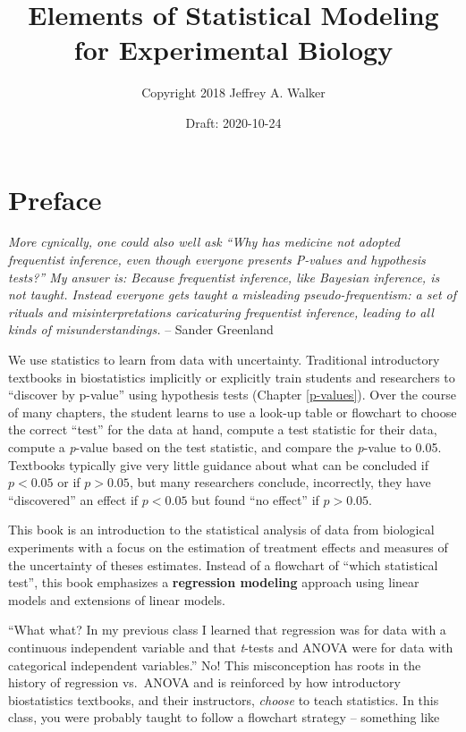 \documentclass[]{book}
\title{Elements of Statistical Modeling for Experimental Biology}
\author{Copyright 2018 Jeffrey A. Walker}
\date{Draft: 2020-10-24}
\begin{document}
\maketitle

{
\setcounter{tocdepth}{1}
\tableofcontents
}
\hypertarget{preface}{%
\chapter*{Preface}\label{preface}}

\emph{More cynically, one could also well ask ``Why has medicine not adopted frequentist inference, even though everyone presents P-values and hypothesis tests?'' My answer is: Because frequentist inference, like Bayesian inference, is not taught. Instead everyone gets taught a misleading pseudo-frequentism: a set of rituals and misinterpretations caricaturing frequentist inference, leading to all kinds of misunderstandings.} -- Sander Greenland

We use statistics to learn from data with uncertainty. Traditional introductory textbooks in biostatistics implicitly or explicitly train students and researchers to ``discover by p-value'' using hypothesis tests (Chapter \ref{p-values}). Over the course of many chapters, the student learns to use a look-up table or flowchart to choose the correct ``test'' for the data at hand, compute a test statistic for their data, compute a \emph{p}-value based on the test statistic, and compare the \emph{p}-value to 0.05. Textbooks typically give very little guidance about what can be concluded if \(p < 0.05\) or if \(p > 0.05\), but many researchers conclude, incorrectly, they have ``discovered'' an effect if \(p < 0.05\) but found ``no effect'' if \(p > 0.05\).

This book is an introduction to the statistical analysis of data from biological experiments with a focus on the estimation of treatment effects and measures of the uncertainty of theses estimates. Instead of a flowchart of ``which statistical test'', this book emphasizes a \textbf{regression modeling} approach using linear models and extensions of linear models.

``What what? In my previous class I learned that regression was for data with a continuous independent variable and that \emph{t}-tests and ANOVA were for data with categorical independent variables.'' No! This misconception has roots in the history of regression vs.~ANOVA and is reinforced by how introductory biostatistics textbooks, and their instructors, \emph{choose} to teach statistics. In this class, you were probably taught to follow a flowchart strategy -- something like
\end{document}
